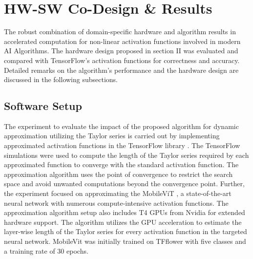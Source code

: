 \documentclass[conference,10pt]{IEEEtran}
\begin{document}
\section{HW-SW Co-Design \& Results}
    \begin{table}[ht]
        \centering
        \caption{Performance Analysis of the Approximation Algorithm on the MobileViT Model}
        \label{table:ViT}
        \renewcommand{\arraystretch}{1.2}
    \end{table}
    
    The robust combination of domain-specific hardware and algorithm results in accelerated computation for non-linear activation functions involved in modern AI Algorithms. The hardware design proposed in section II was evaluated and compared with TensorFlow's activation functions for correctness and accuracy. Detailed remarks on the algorithm's performance and the hardware design are discussed in the following subsections.

\subsection{Software Setup}
    The experiment to evaluate the impact of the proposed algorithm for dynamic approximation utilizing the Taylor series is carried out by implementing approximated activation functions in the TensorFlow library \cite{abadi2016tensorflow}. The TensorFlow simulations were used to compute the length of the Taylor series required by each approximated function to converge with the standard activation function. The approximation algorithm uses the point of convergence to restrict the search space and avoid unwanted computations beyond the convergence point. Further, the experiment focused on approximating the MobileViT \cite{mehta2022mobilevit}, a state-of-the-art neural network with numerous compute-intensive activation functions. The approximation algorithm setup also includes T4 GPUs from Nvidia for extended hardware support. The algorithm utilizes the GPU acceleration to estimate the layer-wise length of the Taylor series for every activation function in the targeted neural network. MobileVit was initially trained on TFflower \cite{tfflowers} with five classes and a training rate of 30 epochs.
    
\end{document}
